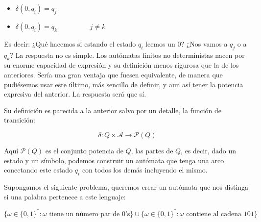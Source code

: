 \begin{multicols}{2}
	\begin{itemize}
		\item $\delta(0,q_i)=q_j$
		\item $\delta(0,q_i)=q_k \hspace{2cm} j\neq k$
	\end{itemize}
\end{multicols}


Es decir: ¿Qué hacemos si estando el estado $q_i$ leemos un $0$? ¿Nos vamos a $q_j$ o a $q_k$? La respuesta no es simple. Los autómatas finitos no deterministas nacen por su enorme capacidad de expresión y su definición menos rigurosa que la de los anteriores. Sería una gran ventaja que fuesen equivalente, de manera que pudiésemos usar este último, más sencillo de definir, y aun así tener la potencia expresiva del anterior. La respuesta será que sí. 

\vspace{10px}


Su definición es parecida a la anterior salvo por un detalle, la función de transición:

\vspace{0.20cm}

$$\delta :Q\times \mathcal{A} \rightarrow \mathcal{P}(Q)$$

\vspace{0.3cm}

Aquí $\mathcal{P}(Q)$ es el conjunto potencia de $Q$, las partes de $Q$, es decir, dado un estado y un símbolo, podemos construir un autómata que tenga una arco conectando este estado $q_i$ con todos los demás incluyendo el mismo.



\newpage

Supongamos el siguiente problema, queremos crear un autómata que nos distinga  si una palabra pertenece a este lenguaje:

$$\{ \omega \in \{0,1\}^* : \omega \text{ tiene un número par de 0's} \} \cup \{\omega  \in \{0,1\}^*: \omega \text{ contiene al cadena }  101 \}$$

